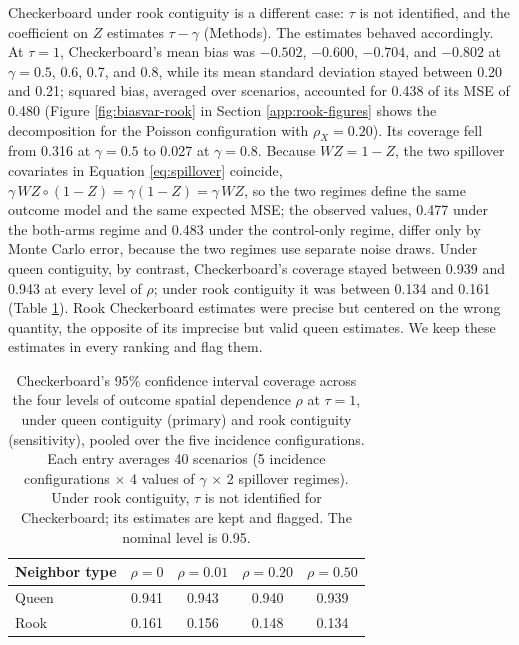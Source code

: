 \documentclass[11pt]{article}
\begin{document}
Checkerboard under rook contiguity is a different case: \(\tau\) is not
identified, and the coefficient on \(Z\) estimates \(\tau - \gamma\)
(Methods). The estimates behaved accordingly. At \(\tau = 1\),
Checkerboard's mean bias was \(-0.502\), \(-0.600\), \(-0.704\), and
\(-0.802\) at \(\gamma = 0.5\), 0.6, 0.7, and 0.8, while its mean
standard deviation stayed between 0.20 and 0.21; squared bias, averaged
over scenarios, accounted for 0.438 of its MSE of 0.480 (Figure
\ref{fig:biasvar-rook} in Section \ref{app:rook-figures} shows the
decomposition for the Poisson configuration with \(\rho_X = 0.20\)). Its
coverage fell from 0.316 at \(\gamma = 0.5\) to 0.027 at
\(\gamma = 0.8\). Because \(WZ = 1 - Z\), the two spillover covariates
in Equation \ref{eq:spillover} coincide,
\(\gamma\, WZ \circ (1 - Z) = \gamma(1 - Z) = \gamma\, WZ\), so the two
regimes define the same outcome model and the same expected MSE; the
observed values, 0.477 under the both-arms regime and 0.483 under the
control-only regime, differ only by Monte Carlo error, because the two
regimes use separate noise draws. Under queen contiguity, by contrast,
Checkerboard's coverage stayed between 0.939 and 0.943 at every level of
\(\rho\); under rook contiguity it was between 0.134 and 0.161 (Table
\ref{tab:checkerboard-coverage}). Rook Checkerboard estimates were
precise but centered on the wrong quantity, the opposite of its
imprecise but valid queen estimates. We keep these estimates in every
ranking and flag them.

\begin{table}[!htb]

\small
\centering

\caption{Checkerboard's 95\% confidence interval coverage across the four levels of outcome spatial dependence $\rho$ at $\tau = 1$, under queen contiguity (primary) and rook contiguity (sensitivity), pooled over the five incidence configurations. Each entry averages 40 scenarios (5 incidence configurations $\times$ 4 values of $\gamma$ $\times$ 2 spillover regimes). Under rook contiguity, $\tau$ is not identified for Checkerboard; its estimates are kept and flagged. The nominal level is 0.95.}
\label{tab:checkerboard-coverage}

\begin{tabular}{lcccc}

\toprule
Neighbor type & $\rho=0$ & $\rho=0.01$ & $\rho=0.20$ & $\rho=0.50$ \\

\midrule
Queen & 0.941 & 0.943 & 0.940 & 0.939 \\
Rook & 0.161 & 0.156 & 0.148 & 0.134 \\

\bottomrule

\end{tabular}

\end{table}
\end{document}
